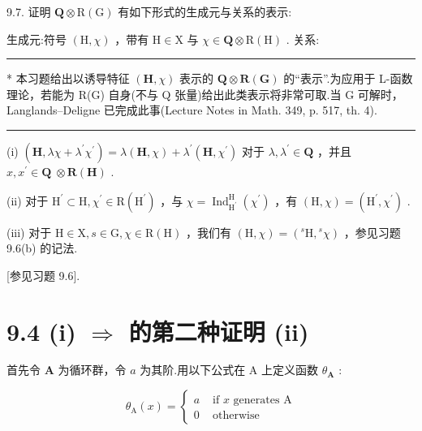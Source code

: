 \documentclass[10pt]{article}
\newcommand{\HRule}{\begin{center}\rule{0.9\linewidth}{0.2mm}\end{center}}
\begin{document}
9.7. 证明 \(\mathbf{Q} \otimes  \mathrm{R}\left( \mathrm{G}\right)\) 有如下形式的生成元与关系的表示:

生成元:符号 \(\left( {\mathrm{H},\chi }\right)\) ，带有 \(\mathrm{H} \in  \mathrm{X}\) 与 \(\chi  \in  \mathbf{Q} \otimes  \mathrm{R}\left( \mathrm{H}\right)\) . 关系:

\HRule

* 本习题给出以诱导特征 \(\left( {\mathbf{H},\chi }\right)\) 表示的 \(\mathbf{Q} \otimes  \mathbf{R}\left( \mathbf{G}\right)\) 的“表示”.为应用于 L-函数理论，若能为 R(G) 自身(不与 Q 张量)给出此类表示将非常可取.当 G 可解时，Langlands–Deligne 已完成此事(Lecture Notes in Math. 349, p. 517, th. 4).

\HRule

(i) \(\left( {\mathbf{H},{\lambda \chi } + {\lambda }^{\prime }{\chi }^{\prime }}\right)  = \lambda \left( {\mathbf{H},\chi }\right)  + {\lambda }^{\prime }\left( {\mathbf{H},{\chi }^{\prime }}\right)\) 对于 \(\lambda ,{\lambda }^{\prime } \in  \mathbf{Q}\) ，并且 \(x,{x}^{\prime } \in  \mathbf{Q} \; \otimes  \mathbf{R}\left( \mathbf{H}\right)\) .

(ii) 对于 \({\mathrm{H}}^{\prime } \subset  \mathrm{H},{\chi }^{\prime } \in  \mathrm{R}\left( {\mathrm{H}}^{\prime }\right)\) ，与 \(\chi  = {\operatorname{Ind}}_{{\mathrm{H}}^{\prime }}^{\mathrm{H}}\left( {\chi }^{\prime }\right)\) ，有 \(\left( {\mathrm{H},\chi }\right)  = \left( {{\mathrm{H}}^{\prime },{\chi }^{\prime }}\right)\) .

(iii) 对于 \(\mathrm{H} \in  \mathrm{X},s \in  \mathrm{G},\chi  \in  \mathrm{R}\left( \mathrm{H}\right)\) ，我们有 \(\left( {\mathrm{H},\chi }\right)  = \left( {{}^{s}\mathrm{H},{}^{s}\chi }\right)\) ，参见习题 9.6(b) 的记法.

[参见习题 9.6].

\section*{9.4 (i) \(\Rightarrow\) 的第二种证明 (ii)}

首先令 \(\mathbf{A}\) 为循环群，令 \(a\) 为其阶.用以下公式在 A 上定义函数 \({\theta }_{\mathbf{A}}\) :

\[
{\theta }_{\mathrm{A}}\left( x\right)  = \left\{  \begin{array}{ll} a & \text{ if }x\text{ generates }\mathrm{A} \\  0 & \text{ otherwise } \end{array}\right.
\]
\end{document}
